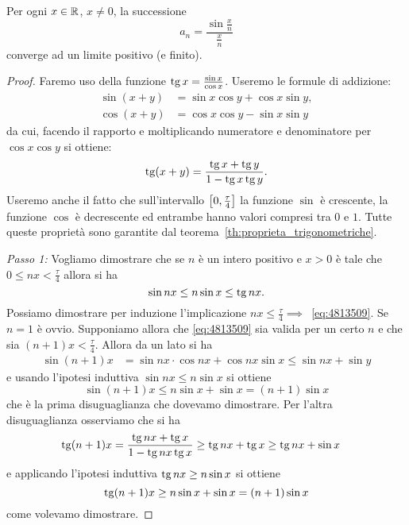 \begin{theorem}
Per ogni $x\in {\mathbb R}$, $x\neq 0$, la successione
\[
    a_n = \frac{\sin \frac xn} {\frac xn}
\]
converge ad un limite positivo (e finito).
\end{theorem}
%
\begin{proof}
Faremo uso della funzione $\operatorname{tg} x= \frac{\sin x}{\cos x}$.
Useremo le formule di addizione:
\begin{align*}
 \sin(x+y) &= \sin x\cos y + \cos x \sin y,\\
 \cos(x+y) &= \cos x \cos y - \sin x \sin y  
\end{align*}
da cui, facendo il rapporto e moltiplicando numeratore 
e denominatore per $\cos x \cos y$ si ottiene:
\[
  \operatorname{tg}(x+y) = \frac{\operatorname{tg} x + \operatorname{tg} y}{1-\operatorname{tg} x \operatorname{tg} y}.
\]
Useremo anche il fatto che sull'intervallo 
$\left[0,\frac \tau 4\right]$
la funzione $\sin$ è crescente, la funzione $\cos $
è decrescente ed entrambe hanno valori compresi 
tra $0$ e $1$.
Tutte queste proprietà sono garantite 
dal teorema~\ref{th:proprieta_trigonometriche}.

\emph{Passo 1:}
Vogliamo dimostrare che se $n$ è un intero positivo 
e $x>0$ è tale che $0\le nx <\frac \tau 4$ allora si ha
\begin{equation}\label{eq:4813509}
  \sin n x \le n\sin x\le \operatorname{tg} nx.
\end{equation}
Possiamo dimostrare per induzione l'implicazione 
$nx\le \frac \tau 4 \implies$~\eqref{eq:4813509}.
Se $n=1$ è ovvio.
Supponiamo allora che \eqref{eq:4813509} 
sia valida per un certo $n$ e che  
sia $(n+1)x<\frac \tau 4$. 
Allora da un lato si ha
\begin{align*}
  \sin (n+1)x 
  &= \sin nx \cdot \cos nx + \cos nx\sin x
  \le \sin nx + \sin y
\end{align*}
e usando l'ipotesi induttiva $\sin nx\le n\sin x$ 
si ottiene 
\[
 \sin(n+1)x \le n\sin x+\sin x = (n+1)\sin x  
\]
che è la prima disuguaglianza che dovevamo dimostrare.
Per l'altra disuguaglianza osserviamo che si ha 
\begin{align*}
  \operatorname{tg}(n+1)x 
  &= \frac{\operatorname{tg} nx + \operatorname{tg} x}{1-\operatorname{tg} nx \operatorname{tg} x}
  \ge \operatorname{tg} nx + \operatorname{tg} x
  \ge \operatorname{tg} nx + \sin x
\end{align*}
e applicando l'ipotesi induttiva 
$\operatorname{tg} nx\ge n\sin x$ si ottiene 
\[
 \operatorname{tg}(n+1)x 
 \ge n\sin x +\sin x 
 =   (n+1)\sin x
\]
come volevamo dimostrare.


\end{proof}
